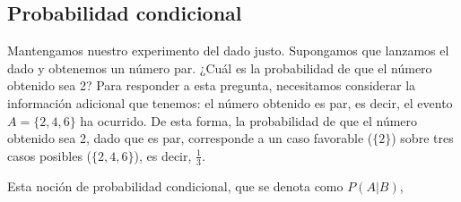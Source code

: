 \subsection{Probabilidad condicional}

Mantengamos nuestro experimento del dado justo. Supongamos que lanzamos el dado y obtenemos un número par.
¿Cuál es la probabilidad de que el número obtenido sea 2? Para responder a esta pregunta, necesitamos considerar
la información adicional que tenemos: el número obtenido es par, es decir, el evento $A = \{2,4,6\}$ ha ocurrido.
De esta forma, la probabilidad de que el número obtenido sea 2, dado que es par, corresponde a un caso favorable
($\{2\}$) sobre tres casos posibles ($\{2,4,6\}$), es decir, $\frac{1}{3}$.

Esta noción de probabilidad condicional, que se denota como $P(A|B)$,



